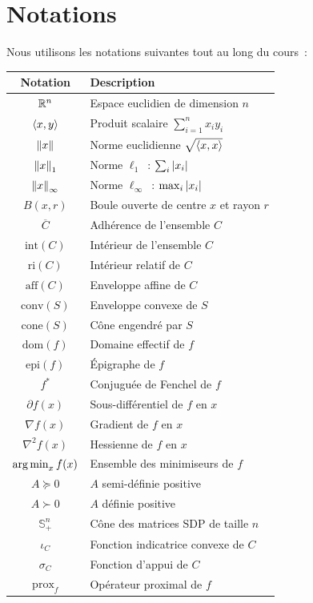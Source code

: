 \section*{Notations}

Nous utilisons les notations suivantes tout au long du cours~:

\begin{center}
\renewcommand{\arraystretch}{1.4}
\begin{tabular}{cl}
    \toprule
    \textbf{Notation} & \textbf{Description} \\
    \midrule
    $\mathbb{R}^n$ & Espace euclidien de dimension $n$ \\
    $\langle x, y \rangle$ & Produit scalaire $\sum_{i=1}^n x_i y_i$ \\
    $\left\| x \right\|$ & Norme euclidienne $\sqrt{\langle x, x \rangle}$ \\
    $\left\| x \right\|_1$ & Norme $\ell_1$~: $\sum_i \left| x_i \right|$ \\
    $\left\| x \right\|_\infty$ & Norme $\ell_\infty$~: $\max_i \left| x_i \right|$ \\
    $B(x,r)$ & Boule ouverte de centre $x$ et rayon $r$ \\
    $\overline{C}$ & Adh\'erence de l'ensemble $C$ \\
    $\mathrm{int}(C)$ & Int\'erieur de l'ensemble $C$ \\
    $\mathrm{ri}(C)$ & Int\'erieur relatif de $C$ \\
    $\mathrm{aff}(C)$ & Enveloppe affine de $C$ \\
    $\mathrm{conv}(S)$ & Enveloppe convexe de $S$ \\
    $\mathrm{cone}(S)$ & C\^one engendr\'e par $S$ \\
    $\mathrm{dom}(f)$ & Domaine effectif de $f$ \\
    $\mathrm{epi}(f)$ & \'Epigraphe de $f$ \\
    $f^*$ & Conjugu\'ee de Fenchel de $f$ \\
    $\partial f(x)$ & Sous-diff\'erentiel de $f$ en $x$ \\
    $\nabla f(x)$ & Gradient de $f$ en $x$ \\
    $\nabla^2 f(x)$ & Hessienne de $f$ en $x$ \\
    $\operatorname*{arg\,min}_{x} f(x)$ & Ensemble des minimiseurs de $f$ \\
    $A \succeq 0$ & $A$ semi-d\'efinie positive \\
    $A \succ 0$ & $A$ d\'efinie positive \\
    $\mathbb{S}^n_+$ & C\^one des matrices SDP de taille $n$ \\
    $\iota_C$ & Fonction indicatrice convexe de $C$ \\
    $\sigma_C$ & Fonction d'appui de $C$ \\
    $\mathrm{prox}_f$ & Op\'erateur proximal de $f$ \\
    \bottomrule
\end{tabular}
\end{center}

